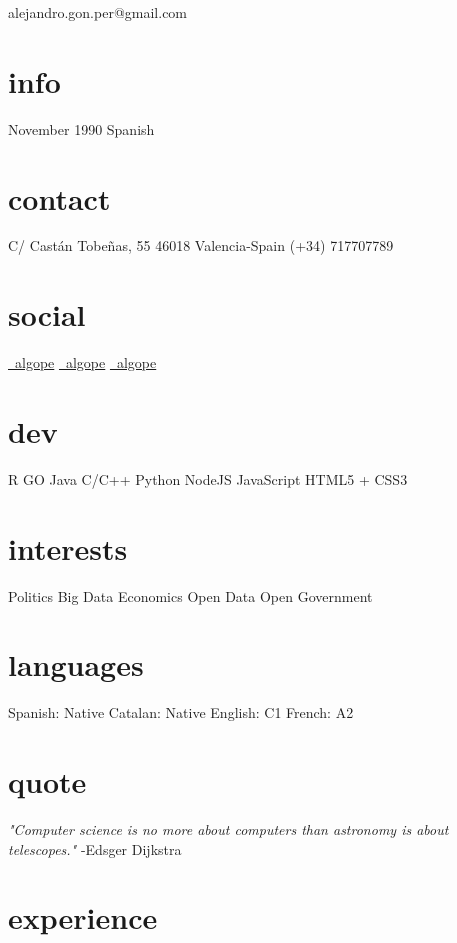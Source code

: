 \documentclass[]{friggeri-cv}
\begin{document}
       {alejandro.gon.per@gmail.com}


\begin{aside}
	\section{info}
	November 1990
	Spanish
    \section{contact}
        C/ Castán Tobeñas, 55
        46018 Valencia-Spain
        (+34) 717707789
    \section{social}
        \href{https://www.linkedin.com/in/algope}{\faLinkedin\ algope} 
        \href{http://github.com/algope}{\faGithub\ algope}
        \href{http://twitter.com/algope_}{\faTwitter\ algope}
    \section{dev}
        R
        GO
        Java
        C/C++
        Python
        NodeJS
        JavaScript
        HTML5 + CSS3
    \section{interests}
        Politics
        Big Data
        Economics
        Open Data
        Open Government
     \section{languages}
     	Spanish: Native
     	Catalan: Native
     	English: C1
     	French: A2
\end{aside}

\section{quote}
\emph{"Computer science is no more about computers than astronomy is about telescopes."} -Edsger Dijkstra

\section{experience}
\end{document}
